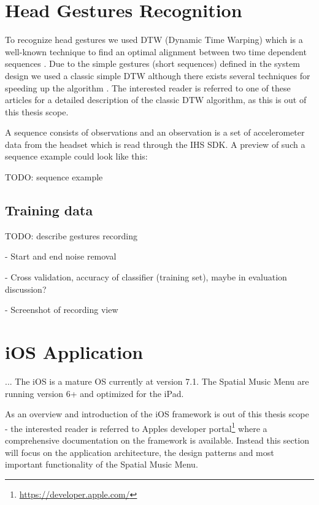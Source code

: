 \section{Head Gestures Recognition}
To recognize head gestures we used DTW (Dynamic Time Warping) which is a well-known technique to find an optimal alignment between two time dependent sequences \cite{muller_dynamic_2007}. Due to the simple gestures (short sequences) defined in the system design we used a classic simple DTW although there exists several techniques for speeding up the algorithm \cite{muller_dynamic_2007,salvador_toward_2007,akl_accelerometer-based_2010}. The interested reader is referred to one of these articles for a detailed description of the classic DTW algorithm, as this is out of this thesis scope.

A sequence consists of observations and an observation is a set of accelerometer data from the headset which is read through the IHS SDK. A preview of such a sequence example could look like this:

TODO: sequence example

\subsection{Training data}


TODO: describe gestures recording

- Start and end noise removal

- Cross validation, accuracy of classifier (training set), maybe in evaluation discussion?

- Screenshot of recording view


\section{iOS Application}
...
The iOS is a mature OS currently at version 7.1. The Spatial Music Menu are running version 6+ and optimized for the iPad.

As an overview and introduction of the iOS framework is out of this thesis scope - the interested reader is referred to Apples developer portal\footnote{\url{https://developer.apple.com/}} where a comprehensive documentation on the framework is available. Instead this section will focus on the application architecture, the design patterns and most important functionality of the Spatial Music Menu.

